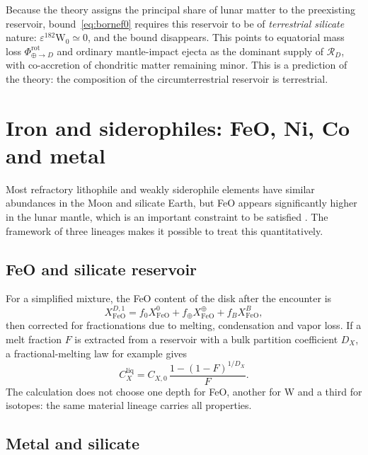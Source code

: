 \documentclass[11pt,a4paper,openany]{report}
\newcommand{\RD}{\mathcal{R}_{D}}
\begin{document}
\begin{lecture}
Because the theory assigns the principal share of lunar matter to the preexisting reservoir,
bound~\eqref{eq:bornef0} requires this reservoir to be of \emph{terrestrial silicate} nature:
$\varepsilon^{182}\mathrm{W}_0\simeq0$, and the bound disappears. This points to equatorial mass loss
$\Phi^{\mathrm{rot}}_{\oplus\to D}$ and ordinary mantle-impact ejecta as the dominant supply of
$\RD$, with co-accretion of chondritic matter remaining minor. This is a prediction of the theory:
the composition of the circumterrestrial reservoir is terrestrial.
\end{lecture}

\section{Iron and siderophiles: FeO, Ni, Co and metal}

Most refractory lithophile and weakly siderophile elements have similar abundances in the Moon and
silicate Earth, but FeO appears significantly higher in the lunar mantle, which is an important
constraint to be satisfied \cite{Canup2023}. The framework of three lineages makes it possible to
treat this quantitatively.

\subsection{FeO and silicate reservoir}

For a simplified mixture, the FeO content of the disk after the encounter is
\begin{equation}
X^{D,1}_{\mathrm{FeO}}=f_0X^{0}_{\mathrm{FeO}}+f_\oplus X^{\oplus}_{\mathrm{FeO}}+f_BX^{B}_{\mathrm{FeO}},
\label{eq:FeO}
\end{equation}
then corrected for fractionations due to melting, condensation and vapor loss. If a melt fraction
$F$ is extracted from a reservoir with a bulk partition coefficient $D_X$, a fractional-melting law
for example gives
\begin{equation}
C_X^{\mathrm{liq}}=C_{X,0}\,\frac{1-(1-F)^{1/D_X}}{F}.
\label{eq:fusion}
\end{equation}
The calculation does not choose one depth for FeO, another for W and a third for isotopes: the same
material lineage carries all properties.

\subsection{Metal and silicate}
\end{document}
